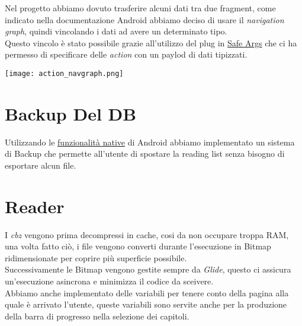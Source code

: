\documentclass[../Assignment-3-LPSMT.tex]{subfiles}
\begin{document}
Nel progetto abbiamo dovuto trasferire alcuni dati tra due fragment, come indicato nella documentazione Android abbiamo deciso di usare il \emph{navigation graph}, quindi vincolando i dati ad avere un determinato tipo.\\
Questo vincolo è stato possibile grazie all'utilizzo del plug in \href{https://developer.android.com/guide/navigation/use-graph/pass-data#Safe-args}{Safe Args} che ci ha permesso di specificare delle \emph{action} con un paylod di dati tipizzati.\\

\begin{center}
  \texttt{[image: action\_navgraph.png]}
\end{center}

\section{Backup Del DB}

Utilizzando le \href{https://developer.android.com/guide/topics/data/autobackup}{funzionalità native} di Android abbiamo implementato un sistema di Backup che permette all'utente di spostare la reading list senza bisogno di esportare alcun file.\\

\section{Reader}

I \emph{cbz} vengono prima decompressi in cache, cosi da non occupare troppa RAM, una volta fatto ciò, i file vengono converti durante l'esecuzione in Bitmap ridimensionate per coprire più superficie possibile.\\
Successivamente le Bitmap vengono gestite sempre da \emph{Glide}, questo ci assicura un'esecuzione asincrona e minimizza il codice da sceivere.\\
Abbiamo anche implementato delle variabili per tenere conto della pagina alla quale è arrivato l'utente, queste variabili sono servite anche per la produzione della barra di progresso nella selezione dei capitoli.
\end{document}
